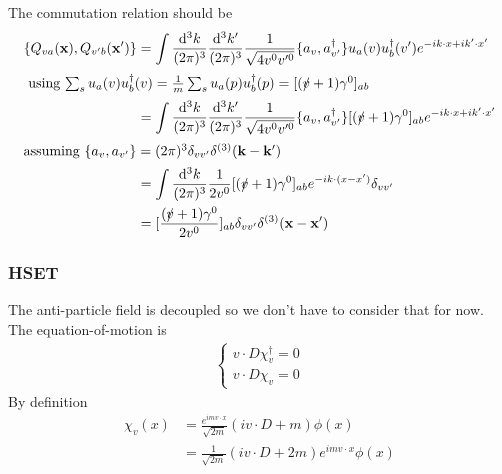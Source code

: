 \documentclass{article}
\newcommand{\g}{\gamma}
\begin{document}
The commutation relation should be 
\begin{align*}
  \{Q_{va}(\vb{x}),Q_{v'b}(\vb{x'})\}&=\int \frac{\dd^3k}{(2\pi)^3}\frac{\dd^3k'}{(2\pi)^3}\frac{1}{\sqrt{4v^0v'^0}}\{a_v,a_{v'}^{\dagger}\}u_a(v)u_b^{\dagger}(v')e^{-ik\cdot x+ik'\cdot x'}\\
  \intertext{
  using $\sum_s u_a(v)u_b^{\dagger}(v)=\frac{1}{m}\sum_s u_a(p)u^{\dagger}_b(p)=[(\slashed v+1)\g^0]_{ab}$}
  &=\int \frac{\dd^3k}{(2\pi)^3}\frac{\dd^3k'}{(2\pi)^3}\frac{1}{\sqrt{4v^0v'^0}}\{a_v,a_{v'}^{\dagger}\}[(\slashed v+1)\g^0]_{ab}e^{-ik\cdot x+ik'\cdot x'}\\
  \intertext{assuming $\{a_v,a_{v'}\}=(2\pi)^3\delta_{vv'}\delta^{(3)}(\vb{k-k'})$}
  &=\int \frac{\dd^3k}{(2\pi)^3}\frac{1}{2v^0}[(\slashed v+1)\g^0]_{ab}e^{-ik\cdot (x-x')}\delta_{vv'}\\
  &=[\frac{(\slashed v+1)\g^0}{2v^0}]_{ab}\delta_{vv'}\delta^{(3)}(\vb{x-x'})
\end{align*}
\subsubsection{HSET}
The anti-particle field is decoupled so we don't have to consider that for now. The equation-of-motion is 
\begin{align*}
  \begin{cases} 
	v\cdot D\chi_v^{\dagger}=0\\
	v\cdot D\chi_v=0
  \end{cases}
\end{align*}
By definition
\begin{align*}
  \chi_v(x)&=\frac{e^{imv\cdot x}}{\sqrt{2m}}(iv\cdot D+m)\phi(x)\\
  &=\frac{1}{\sqrt{2m}}(iv\cdot D+2m)e^{imv\cdot x}\phi(x)
\end{align*}
\end{document}
